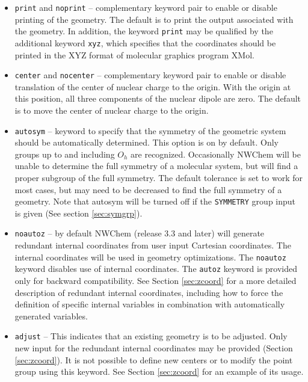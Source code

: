 \begin{itemize}
\item \verb+print+ and \verb+noprint+ -- complementary keyword pair to
  enable or disable printing of the geometry.  The default is to print
  the output associated with the geometry.  In addition, the keyword
  \verb+print+ may be qualified by the additional keyword \verb+xyz+,
  which specifies that the coordinates should be printed in the XYZ
  format of molecular graphics program XMol.

\item \verb+center+ and \verb+nocenter+ -- complementary keyword pair
  to enable or disable translation of the center of nuclear charge to
  the origin.  With the origin at this position, all three components
  of the nuclear dipole are zero.  The default is to move the center
  of nuclear charge to the origin.

\item \verb+autosym+ -- keyword to specify that the symmetry of the
  geometric system should be automatically determined.  This option is on
  by default.  Only groups up to and including $O_{h}$ are recognized.
  Occasionally NWChem will be unable to determine the full symmetry
  of a molecular system, but will find a proper subgroup of the full 
  symmetry.  The default tolerance is set to work for most cases, but may
  need to be decreased to find the full symmetry of a geometry.  Note that
  autosym will be turned off if the \verb+SYMMETRY+ group input is given
  (See section \ref{sec:symgrp}).

\item \verb+noautoz+ -- by default NWChem (release 3.3 and later) 
  will generate redundant internal coordinates from user input
  Cartesian coordinates.  The internal coordinates will be used in
  geometry optimizations.  The \verb+noautoz+ keyword disables use of
  internal coordinates.  The \verb+autoz+ keyword is provided only for
  backward compatibility.  See Section \ref{sec:zcoord} for a more
  detailed description of redundant internal coordinates, including
  how to force the definition of specific internal variables in
  combination with automatically generated variables.

\item \verb+adjust+ -- This indicates that an existing geometry is
  to be adjusted.  Only new input for the redundant internal
  coordinates may be provided (Section \ref{sec:zcoord}).  It is 
  not possible to define new centers or to modify the point
  group using this keyword.  See Section \ref{sec:zcoord} for 
  an example of its usage.


\end{itemize}
